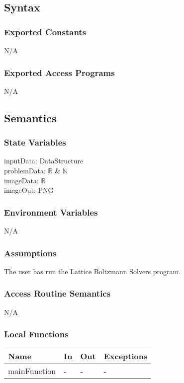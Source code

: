 \documentclass[12pt, titlepage]{article}
\newcommand{\famname}{Lattice Boltzmann Solvers}
\begin{document}
\subsection{Syntax}

\subsubsection{Exported Constants}
N/A

\subsubsection{Exported Access Programs}
N/A

\subsection{Semantics}

\subsubsection{State Variables}
inputData: DataStructure\\
problemData: $\mathbb{R}$ \& $\mathbb{N}$\\
imageData: $\mathbb{R}$\\
imageOut: PNG\\


\subsubsection{Environment Variables}

N/A

\subsubsection{Assumptions}

The user has run the {\famname} program.

\subsubsection{Access Routine Semantics}

N/A

\subsubsection{Local Functions}

\begin{center}
	\begin{tabular}{p{4cm} p{4cm} p{2cm} p{2cm}}
		\hline
		\textbf{Name} & \textbf{In} & \textbf{Out} & \textbf{Exceptions} \\
		\hline
		mainFunction & - & - &- \\
		\hline
	\end{tabular}
\end{center}
\end{document}
